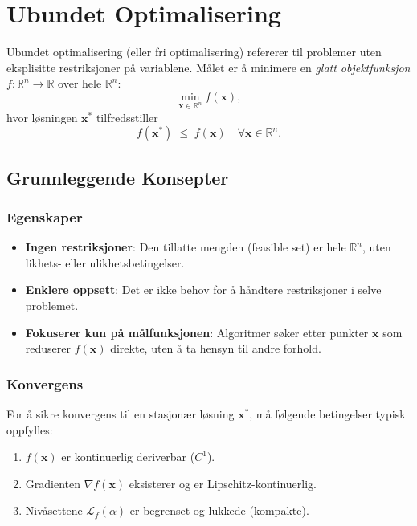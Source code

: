 \chapter{Ubundet Optimalisering}
\label{chap:unconstrained_optimization}

Ubundet optimalisering (eller fri optimalisering) refererer til problemer uten eksplisitte restriksjoner på variablene. 
Målet er å minimere en \textit{glatt objektfunksjon} \( f : \mathbb{R}^n \to \mathbb{R} \) over hele \(\mathbb{R}^n\):
\[
  \min_{\symbf{x} \in \mathbb{R}^n} f(\symbf{x}),
\]
hvor løsningen \(\symbf{x}^*\) tilfredsstiller
\[
  f(\symbf{x}^*) \;\le\; f(\symbf{x}) 
  \quad \forall \symbf{x} \in \mathbb{R}^n.
\]

\section{Grunnleggende Konsepter}

\subsection{Egenskaper}

\begin{itemize}
  \item \textbf{Ingen restriksjoner}: Den tillatte mengden (feasible set) er hele \(\mathbb{R}^n\), uten likhets- eller ulikhetsbetingelser.
  \item \textbf{Enklere oppsett}: Det er ikke behov for å håndtere restriksjoner i selve problemet.
  \item \textbf{Fokuserer kun på målfunksjonen}: Algoritmer søker etter punkter \(\symbf{x}\) som reduserer \(f(\symbf{x})\) direkte, uten å ta hensyn til andre forhold.
\end{itemize}

\subsection{Konvergens}
For å sikre konvergens til en stasjonær løsning \(\symbf{x}^*\), må følgende betingelser typisk oppfylles:
\begin{enumerate}
  \item \(f(\symbf{x})\) er kontinuerlig deriverbar (\(C^1\)).
  \item Gradienten \(\nabla f(\symbf{x})\) eksisterer og er Lipschitz-kontinuerlig.
  \item \hyperref[def:level_set]{Nivåsettene} \(\mathcal{L}_f(\alpha)\) er begrenset og lukkede \hyperref[def:compact_set]{(kompakte)}.
\end{enumerate}

